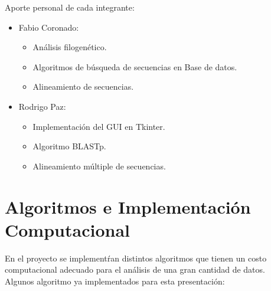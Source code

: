 \documentclass[twocolumn,twoside,12pt]{article}
\begin{document}
Aporte personal de cada integrante:\\
\begin{itemize}
\item Fabio Coronado:
      \begin{itemize}
    
      \item An\'alisis filogen\'etico.
      \item Algoritmos de b\'usqueda de secuencias en Base de datos.
      \item Alineamiento de secuencias. 
      \end{itemize}
\item Rodrigo Paz:
      \begin{itemize}
      \item Implementaci\'on del GUI en Tkinter.
      \item Algoritmo BLASTp.
      \item Alineamiento m\'ultiple de secuencias.
      \end{itemize}

\end{itemize}



\section{Algoritmos e Implementaci\'on Computacional}


En el proyecto se implement\'ran distintos algoritmos que tienen un costo computacional adecuado para el an\'alisis de una gran cantidad de datos.\\

Algunos algoritmo ya implementados para esta presentaci\'on:\\
\\
\end{document}
